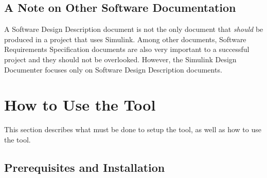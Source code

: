 \documentclass{article}
\makeatletter
\newcommand{\ToolName}{Simulink Design Documenter\@\xspace}
\newcommand{\sdd}{Software Design Description\@\xspace}
\makeatother
\begin{document}
\subsection{A Note on Other Software Documentation}
A \sdd document is not the only document that \emph{should} be produced in a project that uses Simulink. Among other documents, Software Requirements Specification documents are also very important to a successful project and they should not be overlooked. However, the \ToolName{} focuses only on \sdd documents.

\newpage	
\section{How to Use the Tool}
This section describes what must be done to setup the tool, as well as how to use the tool.

\subsection{Prerequisites and Installation}
\end{document}
